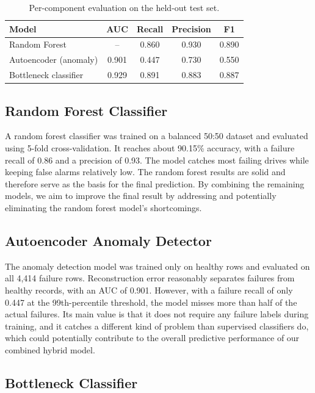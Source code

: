 \documentclass[sigconf,natbib=false]{acmart}
\begin{document}
\begin{table}[h]
\fontsize{8pt}{8pt}\selectfont
\centering
\caption{Per-component evaluation on the held-out test set.}
\label{tab:results}
\begin{tabular}{lcccc}
\toprule
\textbf{Model} & \textbf{AUC} & \textbf{Recall} & \textbf{Precision} & \textbf{F1} \\
\midrule
Random Forest           & --    & 0.860 & 0.930 & 0.890 \\
Autoencoder (anomaly)   & 0.901 & 0.447 & 0.730 & 0.550 \\
Bottleneck classifier   & 0.929 & 0.891 & 0.883 & 0.887 \\
\bottomrule
\end{tabular}
\end{table}

\subsection{Random Forest Classifier}

A random forest classifier was trained on a balanced 50:50 dataset and evaluated using 5-fold cross-validation. It reaches about 90.15\% accuracy, with a failure recall of 0.86 and a precision of 0.93. The model catches most failing drives while keeping false alarms relatively low. The random forest results are solid and therefore serve as the basis for the final prediction. By combining the remaining models, we aim to improve the final result by addressing and potentially eliminating the random forest model's shortcomings.

\subsection{Autoencoder Anomaly Detector}

The anomaly detection model was trained only on healthy rows and evaluated on all 4{,}414 failure rows. Reconstruction error reasonably separates failures from healthy records, with an AUC of 0.901. However, with a failure recall of only 0.447 at the 99th-percentile threshold, the model misses more than half of the actual failures. Its main value is that it does not require any failure labels during training, and it catches a different kind of problem than supervised classifiers do, which could potentially contribute to the overall predictive performance of our combined hybrid model.

\subsection{Bottleneck Classifier}
\end{document}
